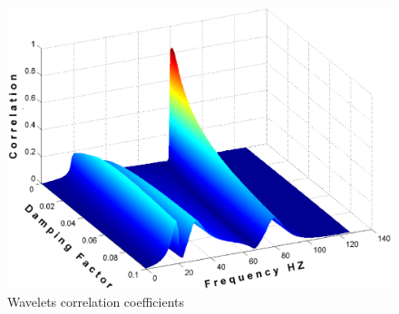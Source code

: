 \begin{figure}[h]
\centering
\label{fig01}
\includegraphics[keepaspectratio=true,scale=0.3]{figuras/fig01.eps}
\caption{Wavelets correlation coefficients}
\end{figure}
